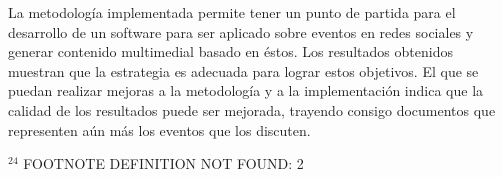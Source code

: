 \documentclass[upright, contnum]{umemoria}
\begin{document}
La metodología implementada permite tener un punto de partida para el
desarrollo de un software para ser aplicado sobre eventos en redes
sociales y generar contenido multimedial basado en éstos. Los
resultados obtenidos muestran que la estrategia es adecuada para
lograr estos objetivos. El que se puedan realizar mejoras a la
metodología y a la implementación indica que la calidad de los
resultados puede ser mejorada, trayendo consigo documentos que
representen aún más los eventos que los discuten.
























$^{24}$ FOOTNOTE DEFINITION NOT FOUND: 2
\end{document}
